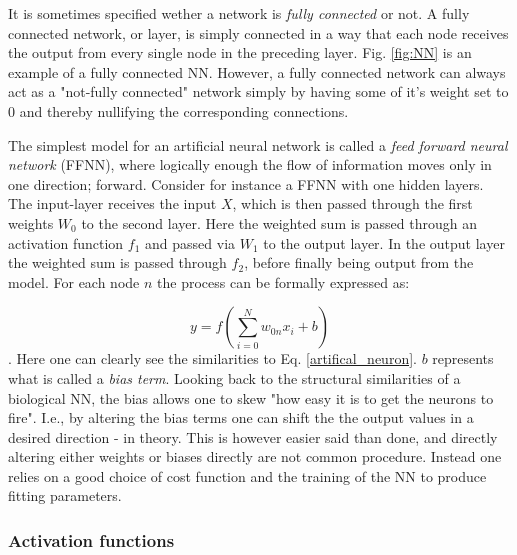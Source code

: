 It is sometimes specified wether a network is \textit{fully connected} or not. A fully connected network, or layer, is simply connected in a way that each node receives the output from every single node in the preceding layer. Fig. \ref{fig:NN} is an example of a fully connected NN. However, a fully connected network can always act as a "not-fully connected" network simply by having some of it's weight set to $0$ and thereby nullifying the corresponding connections. 

The simplest model for an artificial neural network is called a \textit{feed forward neural network} (FFNN), where logically enough the flow of information moves only in one direction; forward. Consider for instance a FFNN with one hidden layers. The input-layer receives the input $X$, which is then passed through the first weights $W_0$ to the second layer. Here the weighted sum is passed through an activation function $f_1$ and passed via $W_1$ to the output layer. In the output layer the weighted sum is passed through $f_2$, before finally being output from the model. 
For each node $n$ the process can be formally expressed as:


\begin{equation}
    y = f\left( \sum_{i=0}^N w_{0n}x_i + b\right)
\end{equation}
\citep[p.17]{Ketkar2017}. Here one can clearly see the similarities to Eq. \ref{artifical_neuron}. $b$ represents what is called a \textit{bias term}. Looking back to the structural similarities of a biological NN, the bias allows one to skew "how easy it is to get the neurons to fire". I.e., by altering the bias terms one can shift the the output values in a desired direction - in theory. This is however easier said than done, and directly altering either weights or biases directly are not common procedure. Instead one relies on a good choice of cost function and the training of the NN to produce fitting parameters. 


\subsubsection{Activation functions}\label{sec:activation_func}

